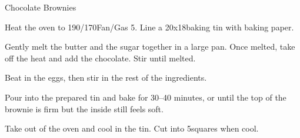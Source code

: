 \begin{recipe}{Chocolate Brownies}

    \begin{ingredients}
    \end{ingredients}

    \begin{instructions}
        Heat the oven to 190\degC/170\degC Fan/Gas 5. Line a 20x18\cm baking tin with baking paper.

        Gently melt the butter and the sugar together in a large pan. Once melted, take off the heat and add the chocolate. Stir until melted.

        Beat in the eggs, then stir in the rest of the ingredients.

        Pour into the prepared tin and bake for 30–40 minutes, or until the top of the brownie is firm but the inside still feels soft.

        Take out of the oven and cool in the tin. Cut into 5\cm squares when cool.
    \end{instructions}
\end{recipe}
